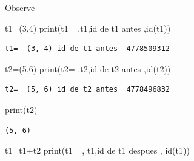 \documentclass[
  ignorenonframetext,
  aspectratio=169,
  spanish,
]{beamer}
\newenvironment{Shaded}{\begin{snugshade}}{\end{snugshade}}
\newcommand{\BuiltInTok}[1]{\textcolor[rgb]{0.00,0.23,0.31}{#1}}
\newcommand{\DecValTok}[1]{\textcolor[rgb]{0.68,0.00,0.00}{#1}}
\newcommand{\NormalTok}[1]{\textcolor[rgb]{0.00,0.23,0.31}{#1}}
\newcommand{\OperatorTok}[1]{\textcolor[rgb]{0.37,0.37,0.37}{#1}}
\newcommand{\StringTok}[1]{\textcolor[rgb]{0.13,0.47,0.30}{#1}}
\begin{document}
\begin{frame}[fragile]{Observe}
\label{observe}
\begin{Shaded}
\begin{Highlighting}[]
\NormalTok{t1}\OperatorTok{=}\NormalTok{(}\DecValTok{3}\NormalTok{,}\DecValTok{4}\NormalTok{) }
\BuiltInTok{print}\NormalTok{(}\StringTok{\textquotesingle{}t1= \textquotesingle{}}\NormalTok{,t1,}\StringTok{\textquotesingle{}id de t1 antes \textquotesingle{}}\NormalTok{,}\BuiltInTok{id}\NormalTok{(t1))}
\end{Highlighting}
\end{Shaded}

\begin{verbatim}
t1=  (3, 4) id de t1 antes  4778509312
\end{verbatim}

\begin{Shaded}
\begin{Highlighting}[]
\NormalTok{t2}\OperatorTok{=}\NormalTok{(}\DecValTok{5}\NormalTok{,}\DecValTok{6}\NormalTok{)}
\BuiltInTok{print}\NormalTok{(}\StringTok{\textquotesingle{}t2= \textquotesingle{}}\NormalTok{,t2,}\StringTok{\textquotesingle{}id de t2 antes \textquotesingle{}}\NormalTok{,}\BuiltInTok{id}\NormalTok{(t2))}
\end{Highlighting}
\end{Shaded}

\begin{verbatim}
t2=  (5, 6) id de t2 antes  4778496832
\end{verbatim}

\begin{Shaded}
\begin{Highlighting}[]
\BuiltInTok{print}\NormalTok{(t2)}
\end{Highlighting}
\end{Shaded}

\begin{verbatim}
(5, 6)
\end{verbatim}

\begin{Shaded}
\begin{Highlighting}[]
\NormalTok{t1}\OperatorTok{=}\NormalTok{t1}\OperatorTok{+}\NormalTok{t2}
\BuiltInTok{print}\NormalTok{(}\StringTok{\textquotesingle{}t1= \textquotesingle{}}\NormalTok{, t1,}\StringTok{\textquotesingle{}id de t1 despues \textquotesingle{}}\NormalTok{, }\BuiltInTok{id}\NormalTok{(t1))}
\end{Highlighting}
\end{Shaded}


\end{frame}
\end{document}
